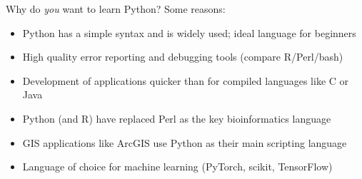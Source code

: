 \documentclass[xcolor=table,aspectratio=169]{beamer}
\begin{document}
\begin{frame}{Why do \textit{you} want to learn Python?}
    Some reasons:
    \pause
    \begin{itemize}
        \item Python has a simple syntax and is widely used; ideal language for beginners
            \pause
        \item High quality error reporting and debugging tools (compare R/Perl/bash)
            \pause
        \item Development of applications quicker than for compiled languages like C or Java
            \pause
        \item Python (and R) have replaced Perl as the key bioinformatics language
            \pause
        \item GIS applications like ArcGIS use Python as their main scripting language
            \pause
        \item Language of choice for machine learning (PyTorch, scikit, TensorFlow)
    \end{itemize}
\end{frame}

\end{document}
